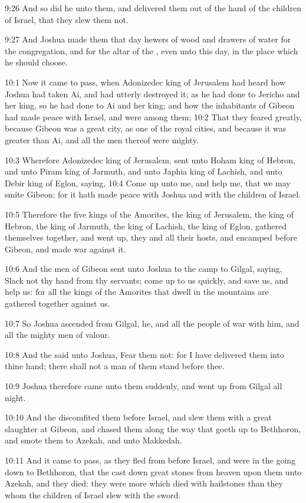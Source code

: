 9:26 And so did he unto them, and delivered them out of the hand of
the children of Israel, that they slew them not.

9:27 And Joshua made them that day hewers of wood and drawers of water
for the congregation, and for the altar of the \LORD, even unto this
day, in the place which he should choose.

10:1 Now it came to pass, when Adonizedec king of Jerusalem had heard
how Joshua had taken Ai, and had utterly destroyed it; as he had done
to Jericho and her king, so he had done to Ai and her king; and how
the inhabitants of Gibeon had made peace with Israel, and were among
them; 10:2 That they feared greatly, because Gibeon was a great city,
as one of the royal cities, and because it was greater than Ai, and
all the men thereof were mighty.

10:3 Wherefore Adonizedec king of Jerusalem, sent unto Hoham king of
Hebron, and unto Piram king of Jarmuth, and unto Japhia king of
Lachish, and unto Debir king of Eglon, saying, 10:4 Come up unto me,
and help me, that we may smite Gibeon: for it hath made peace with
Joshua and with the children of Israel.

10:5 Therefore the five kings of the Amorites, the king of Jerusalem,
the king of Hebron, the king of Jarmuth, the king of Lachish, the king
of Eglon, gathered themselves together, and went up, they and all
their hosts, and encamped before Gibeon, and made war against it.

10:6 And the men of Gibeon sent unto Joshua to the camp to Gilgal,
saying, Slack not thy hand from thy servants; come up to us quickly,
and save us, and help us: for all the kings of the Amorites that dwell
in the mountains are gathered together against us.

10:7 So Joshua ascended from Gilgal, he, and all the people of war
with him, and all the mighty men of valour.

10:8 And the \LORD said unto Joshua, Fear them not: for I have
delivered them into thine hand; there shall not a man of them stand
before thee.

10:9 Joshua therefore came unto them suddenly, and went up from Gilgal
all night.

10:10 And the \LORD discomfited them before Israel, and slew them with
a great slaughter at Gibeon, and chased them along the way that goeth
up to Bethhoron, and smote them to Azekah, and unto Makkedah.

10:11 And it came to pass, as they fled from before Israel, and were
in the going down to Bethhoron, that the \LORD cast down great stones
from heaven upon them unto Azekah, and they died: they were more which
died with hailstones than they whom the children of Israel slew with
the sword.

